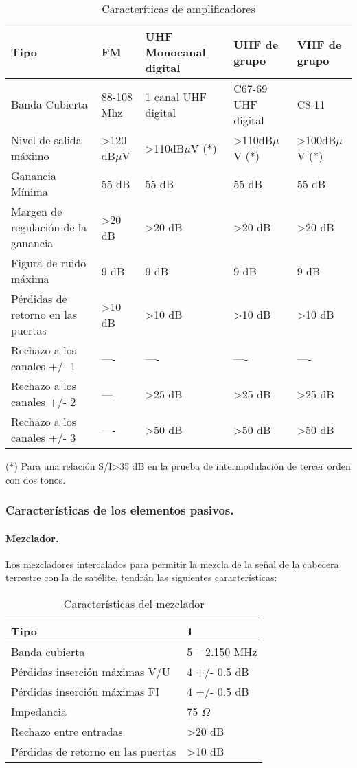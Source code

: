 \begin{table}[H]
\caption{Caracteríticas de amplificadores}
\centering
\label{amplis}
\begin{tabularx}{\textwidth}{Bssss}
    Tipo & FM & UHF Monocanal digital & UHF de grupo & VHF de grupo\\
\hline
\hline
    Banda Cubierta & 88-108 Mhz & 1 canal UHF digital & C67-69 UHF digital & C8-11\\
    Nivel de salida máximo & >120 dB$\mu$V & >110dB$\mu$V (*) & >110dB$\mu$V (*)& >100dB$\mu$V (*)\\
    Ganancia Mínima & 55 dB & 55 dB & 55 dB & 55 dB \\
    Margen de regulación de la ganancia & >20 dB & >20 dB & >20 dB & >20 dB\\
    Figura de ruido máxima & 9 dB & 9 dB & 9 dB & 9 dB\\
    Pérdidas de retorno en las puertas & >10 dB & >10 dB & >10 dB & >10 dB\\
    Rechazo a los canales +/- 1 & ---- & ---- & ---- & ---- \\
    Rechazo a los canales +/- 2 & ---- & >25 dB & >25 dB & >25 dB \\
    Rechazo a los canales +/- 3 & ---- & >50 dB & >50 dB & >50 dB \\
    
\end{tabularx}
\end{table}

(*) Para una relación S/I>35 dB en la prueba de intermodulación de tercer orden con dos tonos.

\subsubsection{Características de los elementos pasivos.}
\paragraph{Mezclador.}

Los mezcladores intercalados para permitir la mezcla de la señal de la cabecera terrestre con la de satélite, tendrán las siguientes características:

\begin{table}[H]
\caption{Características del mezclador}
\centering
\label{mezclador}
\begin{tabular}{l l}
    Tipo & 1\\
\hline
\hline
    Banda cubierta  & 5 – 2.150 MHz \\
    Pérdidas inserción máximas V/U & 4 +/- 0.5 dB\\
    Pérdidas inserción máximas FI & 4 +/- 0.5 dB\\
    Impedancia & 75 $\Omega$\\
    Rechazo entre entradas & >20 dB\\
    Pérdidas de retorno en las puertas & >10 dB
\end{tabular}
\end{table}

